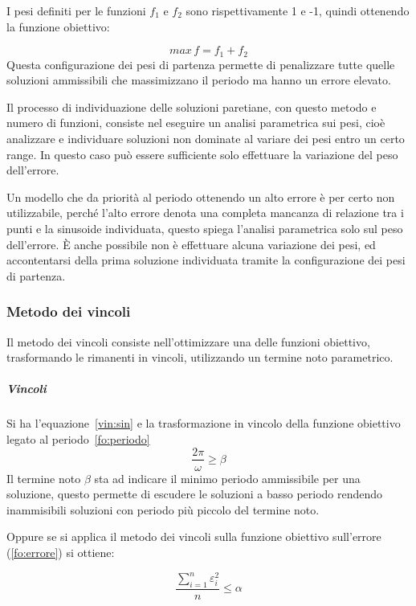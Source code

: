 \documentclass[a4paper,12pt]{report}
\begin{document}
I pesi definiti per le funzioni $ f_1 $ e $ f_2 $ sono rispettivamente 1 e -1, quindi ottenendo la funzione obiettivo:

\begin{equation}
max \, f = f_1 + f_2
\end{equation}
Questa configurazione dei pesi di partenza permette di penalizzare tutte quelle soluzioni ammissibili che massimizzano il periodo ma hanno un errore elevato.

Il processo di individuazione delle soluzioni paretiane, con questo metodo e numero di funzioni, consiste nel eseguire un analisi parametrica sui pesi, cioè analizzare e individuare soluzioni non dominate al variare dei pesi entro un certo range. In questo caso può essere sufficiente solo effettuare la variazione del peso dell'errore.

Un modello che da priorità al periodo ottenendo un alto errore è per certo non utilizzabile, perché l'alto errore denota una completa mancanza di relazione tra i punti e la sinusoide individuata, questo spiega l'analisi parametrica solo sul peso dell'errore. È anche possibile non è effettuare alcuna variazione dei pesi, ed accontentarsi della prima soluzione individuata tramite la configurazione dei pesi di partenza.

\subsubsection{Metodo dei vincoli}
Il metodo dei vincoli consiste nell'ottimizzare una delle funzioni obiettivo, trasformando le rimanenti in vincoli, utilizzando un termine noto parametrico.

\subparagraph{Vincoli} Si ha l'equazione~\eqref{vin:sin} e la trasformazione in vincolo della funzione obiettivo legato al periodo~\eqref{fo:periodo}
\begin{equation}
\label{vin:periodo}
\frac{2\pi}{\omega} \ge \beta
\end{equation}
Il termine noto $ \beta $ sta ad indicare il minimo periodo ammissibile per una soluzione, questo permette di escudere le soluzioni a basso periodo rendendo inammisibili soluzioni con periodo più piccolo del termine noto.

Oppure se si applica il metodo dei vincoli sulla funzione obiettivo sull'errore (\ref{fo:errore}) si ottiene:

\begin{equation}
\label{vin:errore}
\frac{\sum_{i=1}^n \varepsilon_i^2}{n} \le \alpha
\end{equation}
\end{document}
